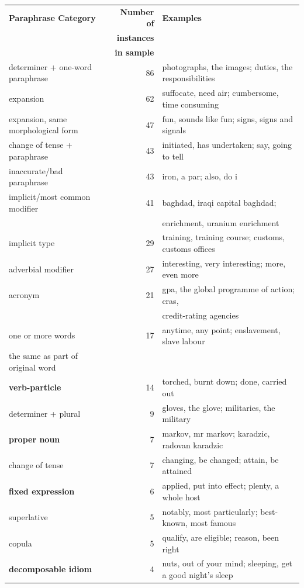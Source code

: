 \documentclass[11pt]{article}
\begin{document}
\begin{table}[h]
\begin{center}
\begin{tabular}{|l|r|l|}
\hline \bf Paraphrase Category & \bf Number of & \bf Examples \\ 
 & \bf instances & \\
 & \bf in sample & \\ \hline
determiner + one-word paraphrase & 86 & photographs, the images; duties, the responsibilities \\
expansion & 62 & suffocate, need air; cumbersome, time consuming \\
expansion, same morphological form & 47 & fun, sounds like fun; signs, signs and signals \\
change of tense + paraphrase & 43 & initiated, has undertaken; say, going to tell \\
inaccurate/bad paraphrase & 43 & iron, a par; also, do i\\
implicit/most common modifier & 41 & baghdad, iraqi capital baghdad; \\
&& enrichment, uranium enrichment \\
implicit type & 29 & training, training course; customs, customs offices \\
adverbial modifier& 27 & interesting, very interesting; more, even more \\
acronym & 21 & gpa, the global programme of action; cras, \\
&& credit-rating agencies \\
one or more words  & 17 &  anytime, any point; enslavement, slave labour \\
the same as part of original word & &\\
\bf verb-particle & 14  & torched, burnt down; done, carried out\\
determiner + plural & 9 & gloves, the glove; militaries, the military\\
\bf proper noun & 7 & markov, mr markov; karadzic, radovan karadzic\\
change of tense & 7 & changing, be changed; attain, be attained\\
\bf fixed expression & 6 & applied, put into effect; plenty, a whole host \\
superlative & 5 & notably, most particularly; best-known, most famous\\
copula & 5 & qualify, are eligible; reason, been right \\
\bf decomposable idiom & 4 & nuts, out of your mind; sleeping, get a good night's sleep\\

\end{tabular}
\end{center}
\end{table}
\end{document}
